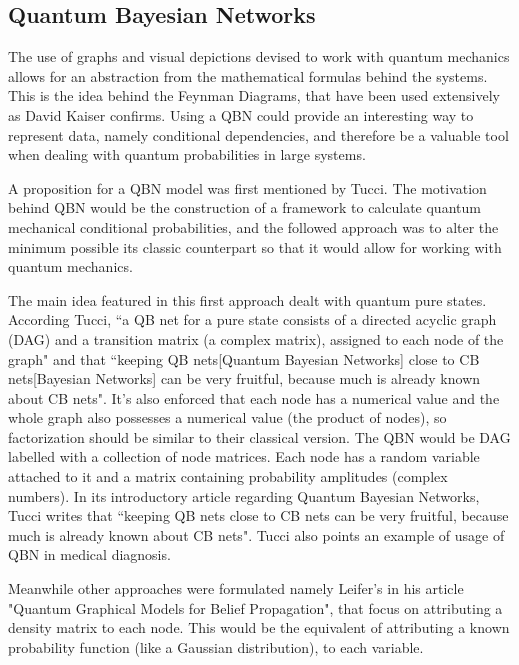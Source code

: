 
\subsection{Quantum Bayesian Networks}

\label{subsec:int_QBN}

The use of graphs and visual depictions devised to work with quantum mechanics allows for an abstraction from the mathematical formulas behind the systems. This is the idea behind the Feynman Diagrams, that have been used extensively as David Kaiser confirms\cite{Kaiser2005}. Using a \ac{QBN} could provide an interesting way to represent data, namely conditional dependencies, and therefore be a valuable tool when dealing with quantum probabilities in large systems.  

A proposition for a \ac{QBN} model was first mentioned by Tucci\cite[1997]{Tucci1997}. The motivation behind \acs{QBN} would be the construction of a framework to calculate quantum mechanical conditional probabilities, and the followed approach was to alter the minimum possible its classic counterpart so that it would allow for working with quantum mechanics.

The main idea featured in this first approach\cite{Tucci1997} dealt with quantum pure states. According Tucci, ``a QB net for a pure state consists of a directed acyclic graph (DAG) and a transition matrix (a complex matrix), assigned to each node of the graph" \cite{Tucci2012} and that ``keeping QB nets[Quantum Bayesian Networks] close to CB nets[Bayesian Networks] can be very fruitful, because much is already known about CB nets"\cite{Tucci2012}. It's also enforced that each node has a numerical value and the whole graph also possesses a numerical value (the product of nodes), so factorization should be similar to their classical version.
The \ac{QBN} would be \ac{DAG} labelled with a collection of node matrices. Each node has a random variable attached to it and a matrix containing probability amplitudes (complex numbers). 
In its introductory article regarding Quantum Bayesian Networks, Tucci writes that ``keeping QB nets close to CB nets can be very fruitful, because much is already known about CB nets"\cite{Tucci2012}. Tucci also points an example of usage of \ac{QBN} in medical diagnosis\cite{Tucci2008}.


Meanwhile other approaches were formulated namely Leifer's\cite{Leifer2008} in his article "Quantum Graphical Models for Belief Propagation", that focus on attributing a density matrix to each node. This would be the equivalent of attributing a known probability function (like a Gaussian distribution), to each variable. 



